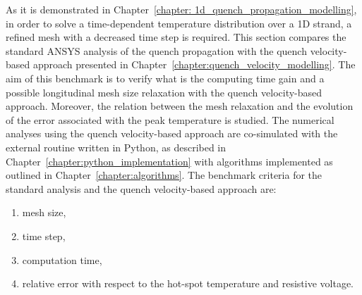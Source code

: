 
As it is demonstrated in Chapter~\ref{chapter: 1d_quench_propagation_modelling}, in order to solve a time-dependent temperature distribution over a 1D strand, a refined mesh with a decreased time step is required. This section compares the standard ANSYS analysis of the quench propagation with the quench velocity-based approach presented in Chapter~\ref{chapter:quench_velocity_modelling}. The aim of this benchmark is to verify what is the computing time gain and a possible longitudinal mesh size relaxation with the quench velocity-based approach. Moreover, the relation between the mesh relaxation and the evolution of the error associated with the peak temperature is studied. The numerical analyses using the quench velocity-based approach are co-simulated with the external routine written in Python, as described in Chapter~\ref{chapter:python_implementation} with algorithms implemented as outlined in Chapter~\ref{chapter:algorithms}. The benchmark criteria for the standard analysis and the quench velocity-based approach are: 
\begin{enumerate}
    \item mesh size,
    \item time step,
    \item computation time,
    \item relative error with respect to the hot-spot temperature and resistive voltage.
\end{enumerate}